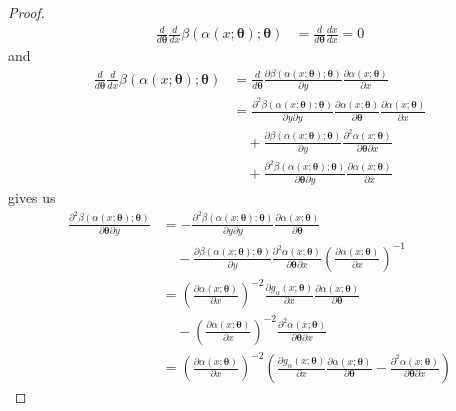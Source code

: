 \documentclass{article}
\begin{document}
\begin{proof}
\begin{align}
        \frac{d }{d \bm \theta} \frac{d }{d x} \beta(\alpha(x; \bm \theta); \bm \theta)  &= \frac{d }{d \bm \theta} \frac{d x}{d x} = 0
    \end{align}
    and
    \begin{align}
        \frac{d }{d \bm \theta} \frac{d }{d x} \beta(\alpha(x; \bm \theta); \bm \theta) 
        &= \frac{d}{d\bm \theta} \frac{\partial \beta(\alpha(x; \bm \theta); \bm \theta)}{\partial y} \frac{\partial \alpha(x; \bm \theta)}{\partial x} \\
        &= \frac{\partial^{2} \beta(\alpha(x; \bm \theta); \bm \theta)}{\partial y\partial y} \frac{\partial \alpha(x; \bm \theta)}{\partial \bm \theta} \frac{\partial \alpha(x; \bm \theta)}{\partial x}  \\
        &\quad + \frac{\partial \beta(\alpha(x; \bm \theta); \bm \theta)}{\partial y} \frac{\partial^{2} \alpha(x; \bm \theta)}{\partial \bm \theta \partial x} \nonumber  \\
        &\quad + \frac{\partial^{2} \beta(\alpha(x; \bm \theta); \bm \theta)}{\partial \bm \theta  \partial y} \frac{\partial \alpha(x; \bm \theta)}{\partial x} \nonumber 
    \end{align}
    gives us
    \begin{align}
        \frac{\partial^{2}\beta(\alpha(x; \bm \theta); \bm \theta)}{\partial \bm \theta \partial y}
        &= - \frac{\partial^{2} \beta(\alpha(x; \bm \theta); \bm \theta)}{\partial y\partial y} \frac{\partial \alpha(x; \bm \theta)}{\partial \bm \theta} \\
        &\quad - \frac{\partial \beta(\alpha(x; \bm \theta); \bm \theta)}{\partial y} \frac{\partial^{2} \alpha(x; \bm \theta)}{\partial \bm \theta \partial x} \left(\frac{\partial \alpha(x; \bm \theta)}{\partial x}\right)^{-1} \nonumber \\
        &= \left(\frac{\partial \alpha(x; \bm \theta)}{\partial x} \right)^{-2} \frac{\partial g_{\alpha}(x; \bm \theta)}{\partial x} \frac{\partial \alpha(x; \bm \theta)}{\partial \bm \theta} \\
        &\quad - \left(\frac{\partial \alpha(x; \bm \theta)}{\partial x} \right)^{-2} \frac{\partial^{2} \alpha(x; \bm \theta)}{\partial \bm \theta \partial x}  \nonumber\\
        &= \left(\frac{\partial \alpha(x; \bm \theta)}{\partial x} \right)^{-2} \left(\frac{\partial g_{\alpha}(x; \bm \theta)}{\partial x} \frac{\partial \alpha(x; \bm \theta)}{\partial \bm \theta}  - \frac{\partial^{2} \alpha(x; \bm \theta)}{\partial \bm \theta \partial x} \right)

\end{align}
\end{proof}
\end{document}
